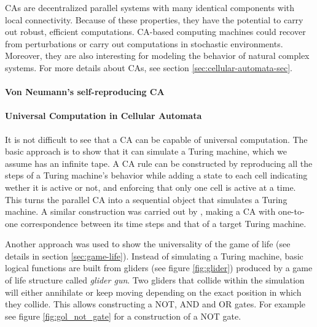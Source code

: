 \Acfp{CA} are decentralized parallel systems with many identical components with
local connectivity. Because of these properties, they have the potential to
carry out robust, efficient computations. \ac{CA}-based computing machines could
recover from perturbations or carry out computations in stochastic environments.
Moreover, they are also interesting for modeling the behavior of natural complex
systems. For more details about \acp{CA}, see section
\ref{sec:cellular-automata-sec}.

\paragraph{Von Neumann's self-reproducing \ac{CA}}


\paragraph{Universal Computation in Cellular Automata}
It is not difficult to see that a \ac{CA} can be capable of universal
computation. The basic approach is to show that it can simulate a Turing
machine, which we assume has an infinite tape. A \ac{CA} rule can be constructed
by reproducing all the steps of a Turing machine's behavior while adding a state
to each cell indicating wether it is active or not, and enforcing that only one
cell is active at a time. This turns the parallel \ac{CA} into a sequential
object that simulates a Turing machine. A similar construction was carried out
by \parencite{smithSimpleComputationUniversalCellular1971}, making a \ac{CA}
with one-to-one correspondence between its time steps and that of a target
Turing machine.

Another approach was used to show the universality of the game of life (see
details in section \ref{sec:game-life}). Instead of simulating a Turing machine,
basic logical functions are built from gliders (see figure \ref{fig:glider})
produced by a game of life structure called \emph{glider gun}. Two gliders
that collide within the simulation will either annihilate or keep moving
depending on the exact position in which they collide. This allows constructing
a NOT, AND and OR gates. For example see figure \ref{fig:gol_not_gate} for a
construction of a NOT gate.


